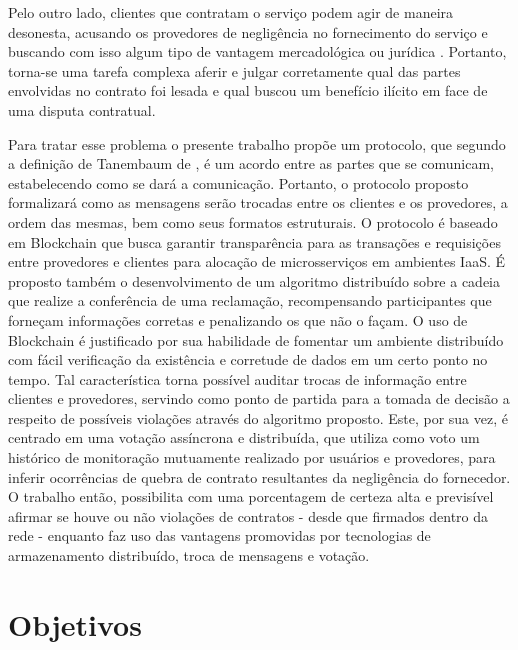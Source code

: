 %
Pelo outro lado, clientes que contratam o serviço podem agir de maneira desonesta, acusando os provedores de negligência no fornecimento do serviço e buscando com isso algum tipo de vantagem mercadológica ou jurídica \cite{nuvem_sla:clientes_desonestos, nuvem_sla:clientes_desonestos2}.
%
Portanto, torna-se uma tarefa complexa aferir e julgar corretamente qual das partes envolvidas no contrato foi lesada e qual buscou um benefício ilícito em face de uma disputa contratual.

Para tratar esse problema o presente trabalho propõe um protocolo, que segundo a definição de Tanembaum de \citeyear{nuvem_sla:tanenbaum}, é um acordo entre as partes que se comunicam, estabelecendo como se dará a comunicação. Portanto, o protocolo proposto formalizará como as mensagens serão trocadas entre os clientes e os provedores, a ordem das mesmas, bem como seus formatos estruturais.
%
%
O protocolo é baseado em Blockchain que busca garantir transparência para as transações e requisições entre provedores e clientes para alocação de microsserviços em ambientes \ac{IaaS}. É proposto também o desenvolvimento de um algoritmo distribuído sobre a cadeia que realize a conferência de uma reclamação, recompensando participantes que forneçam informações corretas e penalizando os que não o façam.
%
O uso de Blockchain é justificado por sua habilidade de fomentar um ambiente distribuído com fácil verificação da existência e corretude de dados em um certo ponto no tempo. Tal característica torna possível auditar trocas de informação entre clientes e provedores, servindo como ponto de partida para a tomada de decisão a respeito de possíveis violações através do algoritmo proposto. Este, por sua vez, é centrado em uma votação assíncrona e distribuída, que utiliza como voto um histórico de monitoração mutuamente realizado por usuários e provedores, para inferir ocorrências de quebra de contrato resultantes da negligência do fornecedor.
%
O trabalho então, possibilita com uma porcentagem de certeza alta e previsível afirmar se houve ou não violações de contratos - desde que firmados dentro da rede - enquanto faz uso das vantagens promovidas por tecnologias de armazenamento distribuído, troca de mensagens e votação.

\section{Objetivos}

